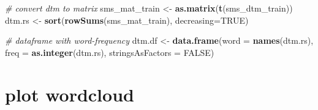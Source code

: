 \documentclass[]{book}
\newenvironment{Shaded}{\begin{snugshade}}{\end{snugshade}}
\newcommand{\CommentTok}[1]{\textcolor[rgb]{0.56,0.35,0.01}{\textit{#1}}}
\newcommand{\DataTypeTok}[1]{\textcolor[rgb]{0.13,0.29,0.53}{#1}}
\newcommand{\KeywordTok}[1]{\textcolor[rgb]{0.13,0.29,0.53}{\textbf{#1}}}
\newcommand{\NormalTok}[1]{#1}
\newcommand{\OtherTok}[1]{\textcolor[rgb]{0.56,0.35,0.01}{#1}}
\newcommand{\StringTok}[1]{\textcolor[rgb]{0.31,0.60,0.02}{#1}}
\begin{document}
\begin{Shaded}
\begin{Highlighting}[]
\CommentTok{# convert dtm to matrix}
\NormalTok{sms_mat_train <-}\StringTok{ }\KeywordTok{as.matrix}\NormalTok{(}\KeywordTok{t}\NormalTok{(sms_dtm_train))}
\NormalTok{dtm.rs <-}\StringTok{ }\KeywordTok{sort}\NormalTok{(}\KeywordTok{rowSums}\NormalTok{(sms_mat_train), }\DataTypeTok{decreasing=}\OtherTok{TRUE}\NormalTok{)}

\CommentTok{# dataframe with word-frequency}
\NormalTok{dtm.df <-}\StringTok{ }\KeywordTok{data.frame}\NormalTok{(}\DataTypeTok{word =} \KeywordTok{names}\NormalTok{(dtm.rs), }\DataTypeTok{freq =} \KeywordTok{as.integer}\NormalTok{(dtm.rs),}
                     \DataTypeTok{stringsAsFactors =} \OtherTok{FALSE}\NormalTok{)}
\end{Highlighting}
\end{Shaded}

\hypertarget{plot-wordcloud}{%
\section{plot wordcloud}\label{plot-wordcloud}}
\end{document}
